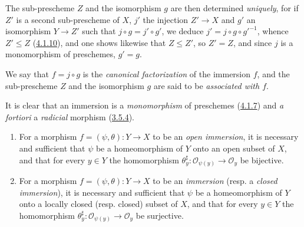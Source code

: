The sub-prescheme $Z$ and the isomorphism $g$ are then determined
\emph{uniquely}, for if $Z'$ is a second sub-prescheme of $X$, $j'$ the
injection $Z'\to X$ and $g'$ an isomorphism $Y\to Z'$ such that
$j\circ g=j'\circ g'$, we deduce $j'=j\circ g\circ {g'}^{-1}$, whence
$Z'\leq Z$ (\hyperref[I.4.1.10]{4.1.10}), and one shows likewise that
$Z\leq Z'$, so $Z'=Z$, and since $j$ is a monomorphism of preschemes,
$g'=g$.

We say that $f=j\circ g$ is the \emph{canonical factorization} of the
immersion $f$, and the sub-prescheme $Z$ and the isomorphism $g$ are said to be
\emph{associated with $f$}.

It is clear that an immersion is a \emph{monomorphism} of preschemes
(\hyperref[I.4.1.7]{4.1.7}) and \emph{a fortiori} a \emph{radicial}
morphism (\hyperref[I.3.5.4]{3.5.4}).

\begin{proposition}[4.2.2]
\label{I.4.2.2}
\begin{enumerate}
  \item[a)] For a morphism $f=(\psi,\theta):Y\to X$ to be an
  \emph{open immersion}, it is necessary and sufficient that $\psi$ be a
  homeomorphism of $Y$ onto an open subset of $X$, and that for every
  $y\in Y$ the homomorphism
  $\theta_y^\sharp:\mathscr{O}_{\psi(y)}\to\mathscr{O}_y$ be bijective.
  \item[b)] For a morphism $f=(\psi,\theta):Y\to X$ to be an
  \emph{immersion} (resp. a \emph{closed immersion}), it is necessary and
  sufficient that $\psi$ be a homeomorphism of $Y$ onto a locally closed
  (resp. closed) subset of $X$, and that for every $y\in Y$ the homomorphism
  $\theta_y^\sharp:\mathscr{O}_{\psi(y)}\to\mathscr{O}_y$ be surjective.
\end{enumerate}
\end{proposition}

